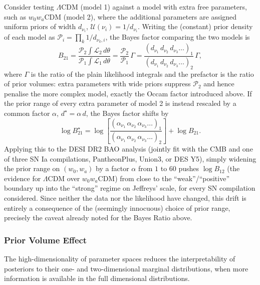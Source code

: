 \begin{exampleblock}
Consider testing $\Lambda$CDM (model 1) against a model with extra free parameters, such as $w_0w_a$CDM (model 2), where the additional parameters are assigned uniform priors of width $d_{\nu_i}$, $\mathcal{U}(\nu_i) = 1/d_{\nu_i}$. Writing the (constant) prior density of each model as $\mathcal{P}_i = \prod_k 1/d_{\nu_k,i}$, the Bayes factor comparing the two models is
$$
B_{21} = \frac{\mathcal{P}_2\int\mathcal{L}_2\,d\theta}{\mathcal{P}_1\int\mathcal{L}_1\,d\theta} = \frac{\mathcal{P}_2}{\mathcal{P}_1}\,\Gamma = \frac{(d_{\nu_1}\,d_{\nu_2}\,d_{\nu_3}\dots)_1}{(d_{\nu_1}\,d_{\nu_2}\,d_{\nu_3}\dots)_2}\,\Gamma ,
$$
where $\Gamma$ is the ratio of the plain likelihood integrals and the prefactor is the ratio of prior volumes: extra parameters with wide priors suppress $\mathcal{P}_2$ and hence penalise the more complex model, exactly the Occam factor introduced above. If the prior range of every extra parameter of model 2 is instead rescaled by a common factor $\alpha$, $d^\star = \alpha\,d$, the Bayes factor shifts by
$$
\log B_{21}^\star = \log\!\left[\frac{(\alpha_{\nu_1}\,\alpha_{\nu_2}\,\alpha_{\nu_3}\dots)_1}{(\alpha_{\nu_1}\,\alpha_{\nu_2}\,\alpha_{\nu_3}\dots)_2}\right] + \log B_{21} .
$$
Applying this to the DESI DR2 BAO analysis (jointly fit with the CMB and one of three SN Ia compilations, PantheonPlus, Union3, or DES Y5), simply widening the prior range on $(w_0,w_a)$ by a factor $\alpha$ from $1$ to $60$ pushes $\log B_{12}$ (the evidence for $\Lambda$CDM over $w_0w_a$CDM) from close to the ``weak''/``positive'' boundary up into the ``strong'' regime on Jeffreys' scale, for every SN compilation considered. Since neither the data nor the likelihood have changed, this drift is entirely a consequence of the (seemingly innocuous) choice of prior range, precisely the caveat already noted for the Bayes Ratio above.
\end{exampleblock}

\subsubsection{Prior Volume Effect}

The high-dimensionality of parameter spaces reduces the interpretability of posteriors to their one- and two-dimensional marginal distributions, when more information is available in the full dimensional distributions.

